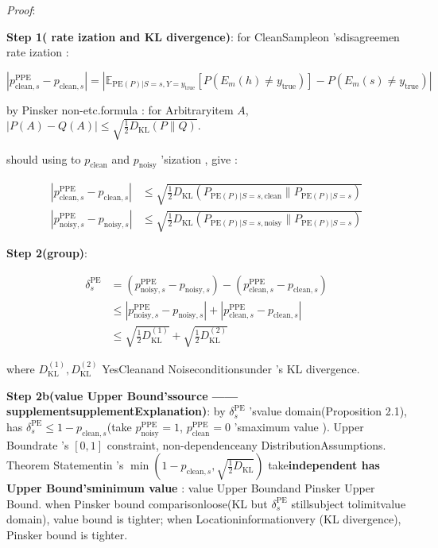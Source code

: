 \documentclass[
  12pt,
]{article}
\begin{document}
\emph{Proof}: 

\textbf{Step 1( rate ization and  KL divergence)}: for CleanSampleon 'sdisagreemen rate ization : 

\[|p_{\text{clean}, s}^{\text{PPE}} - p_{\text{clean}, s}| = \left|\mathbb{E}_{\text{PE}(P)|S=s, Y=y_{\text{true}}}[P(E_m(h) \neq y_{\text{true}})] - P(E_m(s) \neq y_{\text{true}})\right|\]

by  Pinsker non-etc.formula : for Arbitraryitem 
\(A\), \(|P(A) - Q(A)| \leq \sqrt{\frac{1}{2} D_{\text{KL}}(P \| Q)}\). 

should using to  \(p_{\text{clean}}\) and  \(p_{\text{noisy}}\) 'sization , give : 

\begin{align*}
|p_{\text{clean}, s}^{\text{PPE}} - p_{\text{clean}, s}| &\leq \sqrt{\frac{1}{2} D_{\text{KL}}(P_{\text{PE}(P)|S=s, \text{clean}} \| P_{\text{PE}(P)|S=s})} \\
|p_{\text{noisy}, s}^{\text{PPE}} - p_{\text{noisy}, s}| &\leq \sqrt{\frac{1}{2} D_{\text{KL}}(P_{\text{PE}(P)|S=s, \text{noisy}} \| P_{\text{PE}(P)|S=s})}
\end{align*}

\textbf{Step 2(group)}: 

\begin{align*}
\delta_s^{\text{PE}} &= (p_{\text{noisy}, s}^{\text{PPE}} - p_{\text{noisy}, s}) - (p_{\text{clean}, s}^{\text{PPE}} - p_{\text{clean}, s}) \\
&\leq |p_{\text{noisy}, s}^{\text{PPE}} - p_{\text{noisy}, s}| + |p_{\text{clean}, s}^{\text{PPE}} - p_{\text{clean}, s}| \\
&\leq \sqrt{\frac{1}{2} D_{\text{KL}}^{(1)}} + \sqrt{\frac{1}{2} D_{\text{KL}}^{(2)}}
\end{align*}

where \(D_{\text{KL}}^{(1)}, D_{\text{KL}}^{(2)}\)
YesCleanand Noiseconditionsunder 's KL divergence. 

\textbf{Step 2b(value Upper Bound'ssource ------supplementsupplementExplanation)}: by 
\(\delta_s^{\text{PE}}\) 'svalue domain(Proposition 2.1), has 
\(\delta_s^{\text{PE}} \leq 1 - p_{\text{clean}, s}\)(take
\(p_{\text{noisy}}^{\text{PPE}} = 1\),
\(p_{\text{clean}}^{\text{PPE}} = 0\) 'smaximum value ). Upper Boundrate 's
\([0,1]\) constraint, non-dependenceany DistributionAssumptions. Theorem Statementin 's
\(\min(1-p_{\text{clean},s}, \sqrt{\frac{1}{2}D_{\text{KL}}})\)
take\textbf{independent has Upper Bound'sminimum value }: value Upper Boundand  Pinsker Upper Bound. when 
Pinsker bound comparisonloose(KL but  \(\delta_s^{\text{PE}}\)
stillsubject tolimitvalue domain), value bound is tighter; when Locationinformationvery (KL divergence), Pinsker
bound is tighter. 
\end{document}
